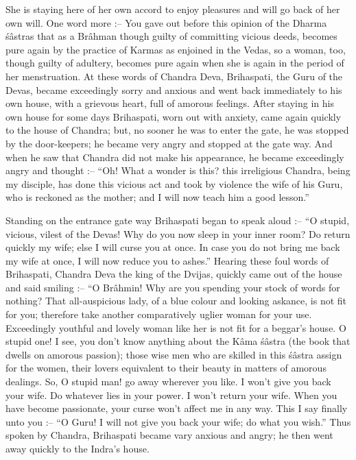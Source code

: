 She is staying here of her own accord to enjoy pleasures and will go back of her own will. One word more :-- You gave out before this opinion of the Dharma \'s\^astras that as a Br\^ahman though guilty of committing vicious deeds, becomes pure again by the practice of Karmas as enjoined in the Vedas, so a woman, too, though guilty of adultery, becomes pure again when she is again in the period of her menstruation. At these words of Chandra Deva, Brihaspati, the Guru of the Devas, became exceedingly sorry and anxious and went back immediately to his own house, with a grievous heart, full of amorous feelings. After staying in his own house for some days Brihaspati, worn out with anxiety, came again quickly to the house of Chandra; but, no sooner he was to enter the gate, he was stopped by the door-keepers; he became very angry and stopped at the gate way. And when he saw that Chandra did not make his appearance, he became exceedingly angry and thought :--  ``Oh! What a wonder is this? this irreligious Chandra, being my disciple, has done this vicious act and took by violence the wife of his Guru, who is reckoned as the mother; and I will now teach him a good lesson.''

Standing on the entrance gate way Brihaspati began to speak aloud :-- ``O stupid, vicious, vilest of the Devas! Why do you now sleep in your inner room? Do return quickly my wife; else I will curse you at once. In case you do not bring me back my wife at once, I will now reduce you to ashes.'' Hearing these foul words of Brihaspati, Chandra Deva the king of the Dvijas, quickly came out of the house and said smiling :-- ``O Br\^ahmin! Why are you spending your stock of words for nothing? That all-auspicious lady, of a blue colour and looking askance, is not fit for you; therefore take another comparatively uglier woman for your use. Exceedingly youthful and lovely woman like her is not fit for a beggar's house. O stupid one! I see, you don't know anything about the K\^ama \'s\^astra (the book that dwells on amorous passion); those wise men who are skilled in this \'s\^astra assign for the women, their lovers equivalent to their beauty in matters of amorous dealings. So, O stupid man! go away wherever you like. I won't give you back your wife. Do whatever lies in your power. I won't return your wife. When you have become passionate, your curse won't affect me in any way. This I say finally unto you :-- ``O Guru! I will not give you back your wife; do what you wish.'' Thus spoken by Chandra, Brihaspati became vary anxious and angry; he then went away quickly to the Indra's house.

